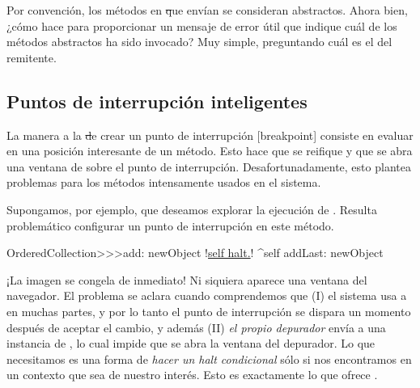 \documentclass[a4paper,10pt,twoside]{book}
\begin{document}
Por convención, los métodos en \st que envían 
se consideran abstractos.  Ahora bien, ¿cómo
hace  para proporcionar un
mensaje de error útil que indique cuál de los métodos abstractos ha
sido invocado?  Muy simple, preguntando cuál es el 
del remitente.

 
\subsection{Puntos de interrupción inteligentes}


La manera a la \st de crear un punto de interrupción [breakpoint]
consiste en evaluar  en una posición interesante de un
método.  Esto hace que  se reifique y que se abra una
ventana de  sobre el punto de interrupción.
Desafortunadamente, esto plantea problemas para los métodos
intensamente usados en el sistema.

Supongamos, por ejemplo, que deseamos explorar la ejecución de
.  Resulta problemático configurar un
punto de interrupción en este método.

\begin{code}{}
OrderedCollection>>>add: newObject
        !\underline{self halt.}!
        ^self addLast: newObject
\end{code}

¡La imagen se congela de inmediato!  Ni siquiera aparece una ventana
del navegador.  El problema se aclara cuando comprendemos que
(\textsc{I}) el sistema usa a  en muchas
partes, y por lo tanto el punto de interrupción se dispara un momento
después de aceptar el cambio, y además (\textsc{II}) \emph{el propio
  depurador} envía  a una instancia de
, lo cual impide que se abra la ventana del
depurador.  Lo que necesitamos es una forma de \emph{hacer un halt
  condicional} sólo si nos encontramos en un contexto que sea de
nuestro interés.  Esto es exactamente lo que ofrece
.
\end{document}
